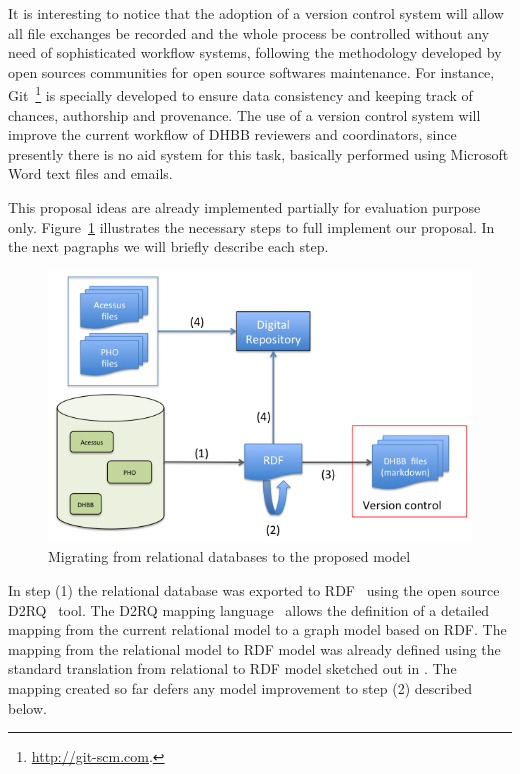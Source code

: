 It is interesting to notice that the adoption of a version control
system will allow all file exchanges be recorded and the whole process
be controlled without any need of sophisticated workflow systems,
following the methodology developed by open sources communities for
open source softwares maintenance. For instance,
Git~\footnote{\url{http://git-scm.com}.} is specially developed to
ensure data consistency and keeping track of chances, authorship and
provenance. The use of a version control system will improve the
current workflow of DHBB reviewers and coordinators, since presently
there is no aid system for this task, basically performed using
Microsoft Word text files and emails.


This proposal ideas are already implemented partially for evaluation
purpose only. Figure~\ref{fig:dia-1} illustrates the necessary steps
to full implement our proposal. In the next pagraphs we will briefly
describe each step.

\begin{figure}[htbp]
  \centering
  \includegraphics[width=.6\textwidth]{migration.png}
  \caption{Migrating from relational databases to the proposed model}\label{fig:dia-1}
\end{figure}

In step (1) the relational database was exported to
RDF~\cite{rdf-primer} using the open source D2RQ~\cite{d2rq} tool. The
D2RQ mapping language~\cite{d2rq-map} allows the definition of a
detailed mapping from the current relational model to a graph model
based on RDF. The mapping from the relational model to RDF model was
already defined using the standard translation from relational to RDF
model sketched out in \cite{dbANDrdf}. The mapping created so far
defers any model improvement to step (2) described below.

